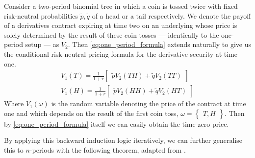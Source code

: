 \documentclass[]{article}
\theoremstyle{remark}
\theoremstyle{plain}
\begin{document}
Consider a two-period binomial tree in which a coin is tossed twice with fixed risk-neutral probabilities $\tilde{p},\tilde{q}$ of a head or a tail respectively. We denote the payoff of a derivatives contract expiring at time two on an underlying whose price is solely determined by the result of these coin tosses --- identically to the one-period setup --- as $V_2$. Then \cref{eq:one_period_formula} extends naturally to give us the conditional risk-neutral pricing formula for the derivative security at time one.
\begin{equation}
	\begin{matrix} V_{1}(T) = \displaystyle\frac{1}{1+r}\begin{bmatrix} \tilde{p}V_{2}(TH) + \tilde{q}V_{2}(TT)\end{bmatrix}\\[8pt] V_{1}(H) = \displaystyle \frac{1}{1+r}\begin{bmatrix} \tilde{p}V_{2}(HH) + \tilde{q}V_{2}(HT)\end{bmatrix} \end{matrix}
\end{equation}
Where $V_1 (\omega)$ is the random variable denoting the price of the contract at time one and which depends on the result of the first coin toss, $\omega = \begin{Bmatrix} T,H \end{Bmatrix}$. Then by \cref{eq:one_period_formula} itself we can easily obtain the time-zero price.

By applying this backward induction logic iteratively, we can further generalise this to $n$-periods with the following theorem, adapted from \cite[Thm~1.2.2]{SHREVE_2004}.
\end{document}
